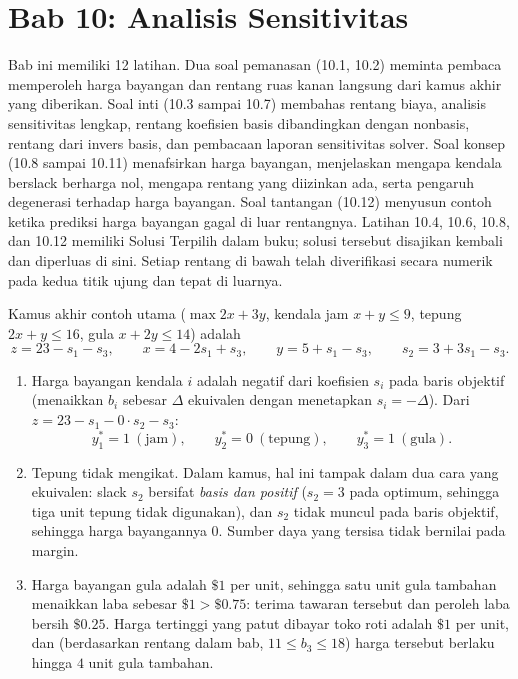 \section{Bab 10: Analisis Sensitivitas}

Bab ini memiliki 12 latihan. Dua soal pemanasan (10.1, 10.2) meminta pembaca memperoleh harga bayangan dan rentang ruas kanan langsung dari kamus akhir yang diberikan. Soal inti (10.3 sampai 10.7) membahas rentang biaya, analisis sensitivitas lengkap, rentang koefisien basis dibandingkan dengan nonbasis, rentang dari invers basis, dan pembacaan laporan sensitivitas solver. Soal konsep (10.8 sampai 10.11) menafsirkan harga bayangan, menjelaskan mengapa kendala berslack berharga nol, mengapa rentang yang diizinkan ada, serta pengaruh degenerasi terhadap harga bayangan. Soal tantangan (10.12) menyusun contoh ketika prediksi harga bayangan gagal di luar rentangnya. Latihan 10.4, 10.6, 10.8, dan 10.12 memiliki Solusi Terpilih dalam buku; solusi tersebut disajikan kembali dan diperluas di sini. Setiap rentang di bawah telah diverifikasi secara numerik pada kedua titik ujung dan tepat di luarnya.


Kamus akhir contoh utama ($\max 2x + 3y$, kendala jam $x+y \le 9$, tepung $2x+y \le 16$, gula $x + 2y \le 14$) adalah
\[
z = 23 - s_1 - s_3, \qquad
x = 4 - 2s_1 + s_3, \qquad
y = 5 + s_1 - s_3, \qquad
s_2 = 3 + 3s_1 - s_3 .
\]

\begin{enumerate}
\item Harga bayangan kendala $i$ adalah negatif dari koefisien $s_i$ pada baris objektif (menaikkan $b_i$ sebesar $\Delta$ ekuivalen dengan menetapkan $s_i = -\Delta$). Dari $z = 23 - s_1 - 0\cdot s_2 - s_3$:
\[
y_1^* = 1 \ (\text{jam}), \qquad y_2^* = 0 \ (\text{tepung}), \qquad y_3^* = 1 \ (\text{gula}).
\]
\item Tepung tidak mengikat. Dalam kamus, hal ini tampak dalam dua cara yang ekuivalen: slack $s_2$ bersifat \emph{basis dan positif} ($s_2 = 3$ pada optimum, sehingga tiga unit tepung tidak digunakan), dan $s_2$ tidak muncul pada baris objektif, sehingga harga bayangannya $0$. Sumber daya yang tersisa tidak bernilai pada margin.
\item Harga bayangan gula adalah $\$1$ per unit, sehingga satu unit gula tambahan menaikkan laba sebesar $\$1 > \$0.75$: terima tawaran tersebut dan peroleh laba bersih $\$0.25$. Harga tertinggi yang patut dibayar toko roti adalah $\$1$ per unit, dan (berdasarkan rentang dalam bab, $11 \le b_3 \le 18$) harga tersebut berlaku hingga $4$ unit gula tambahan.
\end{enumerate}


